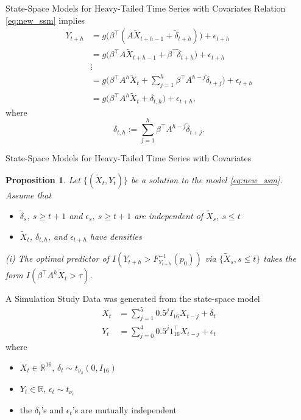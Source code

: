 \documentclass{beamer}
\newtheorem{proposition}{Proposition}
\def\R{\mathbb R}
\begin{document}
\begin{frame}{State-Space Models for Heavy-Tailed Time Series with Covariates}
    Relation \eqref{eq:new_ssm} implies
    \begin{align*}
        Y_{t+h} &= g \Big( \beta^\top ( A \tilde X_{t+h-1} + \tilde  \delta_{t+h})\Big ) + \epsilon_{t+h} \\
        &= g \Big( \beta^\top A \tilde X_{t + h-1} +  \beta^\top \tilde  \delta_{t+h}  \Big) + \epsilon_{t+h} \\
        &\vdots \\
        &= g \Big( \beta^\top A^h \tilde X_t + \sum_{j=1}^h \beta^\top A^{h - j}\tilde  \delta_{t+j}  \Big) +  \epsilon_{t+h} \\
        &= g \Big( \beta^\top A^h \tilde X_t + \delta_{t,h} \Big) + \epsilon_{t+h},
    \end{align*}
    where 
    \begin{equation*}
    \delta_{t,h}:= \sum_{j=1}^h \beta^\top A^{h - j}\tilde  \delta_{t+j}.
    \end{equation*}
\end{frame}

\begin{frame}{State-Space Models for Heavy-Tailed Time Series with Covariates}
    \begin{proposition}
        Let $\{(\tilde X_t,Y_t)\}$ be a solution to the model \eqref{eq:new_ssm}. Assume that
        \begin{itemize}
            \item $\tilde{\delta}_s, \ s \ge t + 1$ and $\epsilon_s, \ s \ge t + 1$ are independent of $\tilde{X}_s, \ s \le t$
            \item $\tilde X_t$, $\delta_{t, h}$, and $\epsilon_{t+h}$ have densities
        \end{itemize}

        \medskip
        
        {\em (i)} The optimal predictor of $I(Y_{t+h}> F_{Y_{t+h}}^{-1}(p_0))$
        via $\{ \tilde X_s, s\le t\}$ takes the form $I(\beta^\top A^{h}\tilde X_t > \tau)$.
    \end{proposition}
\end{frame}

\begin{frame}{A Simulation Study}
    Data was generated from the state-space model
    \begin{align*}
        X_t &= \sum_{j = 1}^5 0.5^j I_{16}X_{t - j} + \delta_t \\
        Y_t &= \sum_{j = 0}^4 0.5^j 1_{16}^{\top}X_{t - j} + \epsilon_t
    \end{align*}
    where
    \begin{itemize}
        \item $X_t \in \R^{16}$, $\delta_t \sim t_{\nu_{\delta}}(0, I_{16})$
        \item $Y_t \in \R$, $\epsilon_t \sim t_{\nu_{\epsilon}}$
        \item the $\delta_t$'s and $\epsilon_t$'s are mutually independent
    \end{itemize}
\end{frame}
\end{document}
